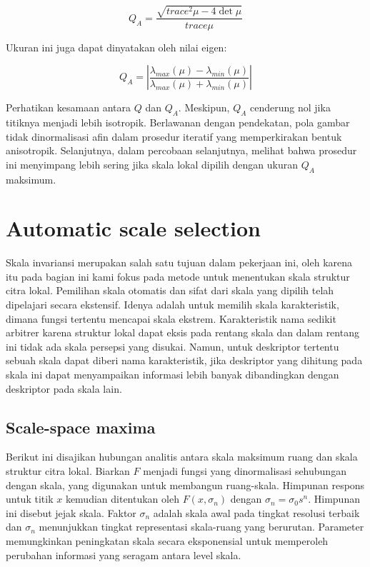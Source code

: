 \begin{equation}
  Q_{A} = \frac{\sqrt{trace^{2}\mu - 4\det\mu}}{trace\mu}
\end{equation}

Ukuran ini juga dapat dinyatakan oleh nilai eigen:

\begin{equation*}
  Q_{A} = \left\lvert \frac{\lambda_{max}(\mu) - \lambda_{min}(\mu)}{\lambda_{max}(\mu) + \lambda_{min}(\mu)}\right\rvert 
\end{equation*}

Perhatikan kesamaan antara \(Q\) dan \(Q_{A}\). Meskipun, \(Q_{A}\) cenderung nol jika titiknya menjadi lebih isotropik. 
Berlawanan dengan pendekatan, pola gambar tidak dinormalisasi afin dalam prosedur iteratif yang memperkirakan bentuk anisotropik. 
Selanjutnya, dalam percobaan selanjutnya, melihat bahwa prosedur ini menyimpang lebih sering jika skala lokal dipilih dengan ukuran \(Q_{A}\) maksimum.

\section{\textbf{Automatic scale selection}}
Skala invariansi merupakan salah satu tujuan dalam pekerjaan ini, oleh karena itu pada bagian ini kami fokus 
pada metode untuk menentukan skala struktur citra lokal. Pemilihan skala otomatis dan sifat dari skala yang 
dipilih telah dipelajari secara ekstensif. Idenya adalah untuk memilih skala karakteristik, 
dimana fungsi tertentu mencapai skala ekstrem. Karakteristik nama sedikit arbitrer karena struktur lokal 
dapat eksis pada rentang skala dan dalam rentang ini tidak ada skala persepsi yang disukai. 
Namun, untuk deskriptor tertentu sebuah skala dapat diberi nama karakteristik, jika deskriptor yang 
dihitung pada skala ini dapat menyampaikan informasi lebih banyak dibandingkan dengan deskriptor pada skala lain.

\subsection{\textbf{Scale-space maxima}}
Berikut ini disajikan hubungan analitis antara skala maksimum ruang dan skala struktur citra lokal. 
Biarkan \(F\) menjadi fungsi yang dinormalisasi sehubungan dengan skala, yang digunakan untuk membangun ruang-skala. 
Himpunan respons untuk titik \(x\) kemudian ditentukan oleh \(F(x,\sigma_{n})\) dengan \(\sigma_{n} =\sigma_{0}s^{n}\). 
Himpunan ini disebut jejak skala. Faktor \(\sigma_{n}\) adalah skala awal pada tingkat resolusi terbaik dan \(\sigma_{n}\) 
menunjukkan tingkat representasi skala-ruang yang berurutan. Parameter memungkinkan peningkatan skala secara eksponensial untuk memperoleh 
perubahan informasi yang seragam antara level skala.

